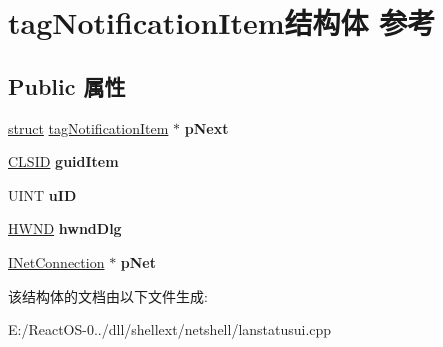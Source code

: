 \hypertarget{structtag_notification_item}{}\section{tag\+Notification\+Item结构体 参考}
\label{structtag_notification_item}
\subsection*{Public 属性}
\begin{DoxyCompactItemize}
\item 
\mbox{\label{structtag_notification_item_a6abcf2ad858e9a3a38d1e82f63b34d9d}} 
\hyperlink{interfacestruct}{struct} \hyperlink{structtag_notification_item}{tag\+Notification\+Item} $\ast$ {\bfseries p\+Next}
\item 
\mbox{\label{structtag_notification_item_ae7bcd48fae22d86670cff2ecacbc3e0e}} 
\hyperlink{struct___i_i_d}{C\+L\+S\+ID} {\bfseries guid\+Item}
\item 
\mbox{\label{structtag_notification_item_abb597aa07445d039f9a01df737447bfe}} 
U\+I\+NT {\bfseries u\+ID}
\item 
\mbox{\label{structtag_notification_item_ae6e322ecf4159f55130d1f368adc0e4d}} 
\hyperlink{interfacevoid}{H\+W\+ND} {\bfseries hwnd\+Dlg}
\item 
\mbox{\label{structtag_notification_item_afce85070339116c2d1b2684a3c943d95}} 
\hyperlink{interface_i_net_connection}{I\+Net\+Connection} $\ast$ {\bfseries p\+Net}
\end{DoxyCompactItemize}


该结构体的文档由以下文件生成\+:\begin{DoxyCompactItemize}
\item 
E\+:/\+React\+O\+S-\/0../dll/shellext/netshell/lanstatusui.\+cpp\end{DoxyCompactItemize}
